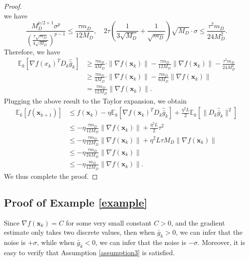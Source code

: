 \documentclass{article}
\newcommand{\bx}{\boldsymbol{x}}
\newcommand{\barg}{\bar{g}}
\theoremstyle{plain}
\theoremstyle{definition}
\theoremstyle{remark}
\begin{document}
\begin{proof}
\begin{equation*}
\end{equation*}
we  have
\begin{equation*}
    \frac{M_D^{p/2+1} \sigma^p}{\left(\frac{\tau\sqrt{m_D}}{4\sqrt{M_D}}\right)^{p-1}} \leq \frac{\tau m_D}{12M_D}, \quad 2\tau \left( \frac{1}{3\sqrt{M_D}} + \frac{1}{\sqrt{m_D}}\right) \sqrt{M_D} \cdot \sigma \leq \frac{\tau^2m_D}{24M_D^2}.
\end{equation*}
Therefore, we have
\begin{align*}
    \mathbb{E}_k[\nabla f(x_k)^T D_k \widehat{\barg}_k ]
    & \geq   \frac{\tau m_D}{4M_D} \cdot \| \nabla f(\bx_k)\| -  \frac{\tau m_D}{12M_D}\|\nabla f(\bx_k)\| - \frac{\tau^2m_D}{24M_D^2} \\
    & \geq \frac{\tau m_D}{4M_D} \cdot \| \nabla f(\bx_k)\| -  \frac{\tau m_D}{6M_D}\|\nabla f(\bx_k)\|\\
    & = \frac{\tau m_D}{12M_D}\|\nabla f(\bx_k)\|.
\end{align*}
Plugging the above result to the Taylor expansion, we obtain
 \begin{align*}
\mathbb{E}_k[f(\bx_{k+1})]  & \leq f(\bx_k) - \eta  \mathbb{E}_k[\nabla f(\bx_k)^T D_k\widehat{\barg}_k] + \frac{\eta^2 L }{2} \mathbb{E}_k[\|D_k\widehat{\barg}_k\|^2]\\
& \leq - \eta \frac{\tau m_D}{12M_D}\|\nabla f(\bx_k)\| + \frac{\eta^2 L }{2}\tau^2 \\
& \leq - \eta \frac{\tau m_D}{12M_D}\|\nabla f(\bx_k)\| + \eta^2 L  \tau M_D \|\nabla f(\bx_k)\| \\
& \leq - \eta \frac{\tau m_D}{24M_D}\|\nabla f(\bx_k)\| \\
& \leq - \eta \frac{ m_D}{12M_D}\|\nabla f(\bx_k)\| .
\end{align*}
We thus complete the proof.
\end{proof}



\subsection{Proof of Example \ref{example} }\label{proof_example}

    Since $\nabla f(\bx_k) = C$ for some very small constant $C>0$, and the gradient estimate only takes two discrete values, then when $\barg_k>0$, we can infer that the noise is $+\sigma$, while when $\barg_k<0$, we can infer that the noise is $-\sigma$. Moreover, it is easy to verify that Assumption \ref{assumption3} is satisfied.
\end{document}
